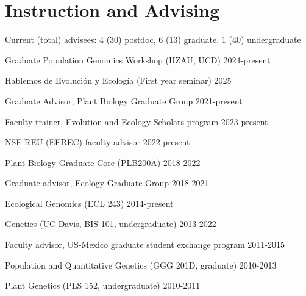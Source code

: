 \documentclass[letterpaper,10pt]{article}
\renewenvironment{itemize}{
  \begin{list}{}{
    \setlength{\leftmargin}{1.5em}
  }
}{
  \end{list}
}
\begin{document}
\section*{Instruction and Advising}
\begin{itemize}
\setlength\itemsep{0ex}
\item Current (total) advisees: 4 (30) postdoc, 6 (13) graduate, 1 (40) undergraduate 


\item Graduate Population Genomics Workshop (HZAU, UCD) \hfill 2024-present
\item Hablemos de Evoluci\'on y Ecolog\'ia (First year seminar) \hfill 2025
\item Graduate Advisor, Plant Biology Graduate Group \hfill 2021-present
\item Faculty trainer, Evolution and Ecology Scholars program \hfill 2023-present
\item NSF REU (EEREC) faculty advisor \hfill 2022-present
\item Plant Biology Graduate Core (PLB200A) \hfill 2018-2022
\item Graduate advisor, Ecology Graduate Group \hfill 2018-2021
\item Ecological Genomics (ECL 243) \hfill 2014-present
\item Genetics (UC Davis, BIS 101, undergraduate) \hfill 2013-2022
\item Faculty advisor, US-Mexico graduate student exchange program \hfill 2011-2015
\item Population and Quantitative Genetics (GGG 201D, graduate) \hfill2010-2013 %
\item Plant Genetics (PLS 152, undergraduate) \hfill 2010-2011 %

\end{itemize}
\end{document}
